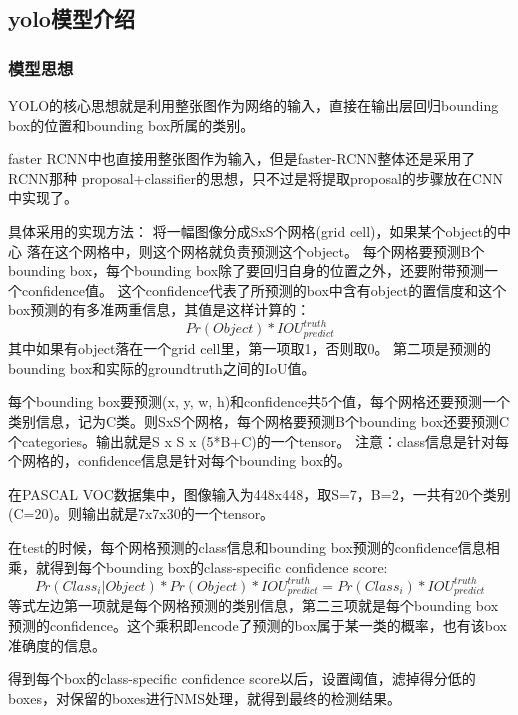 \documentclass[openany]{ctexbook}
\begin{document}
\subsection{yolo模型介绍}
\subsubsection{模型思想}
YOLO的核心思想就是利用整张图作为网络的输入，直接在输出层回归bounding box的位置和bounding box所属的类别。

faster RCNN中也直接用整张图作为输入，但是faster-RCNN整体还是采用了RCNN那种 proposal+classifier的思想，只不过是将提取proposal的步骤放在CNN中实现了。

具体采用的实现方法：
将一幅图像分成SxS个网格(grid cell)，如果某个object的中心 落在这个网格中，则这个网格就负责预测这个object。
每个网格要预测B个bounding box，每个bounding box除了要回归自身的位置之外，还要附带预测一个confidence值。
这个confidence代表了所预测的box中含有object的置信度和这个box预测的有多准两重信息，其值是这样计算的：
$$Pr(Object)*IOU^{truth}_{predict}$$
其中如果有object落在一个grid cell里，第一项取1，否则取0。 第二项是预测的bounding box和实际的groundtruth之间的IoU值。

每个bounding box要预测(x, y, w, h)和confidence共5个值，每个网格还要预测一个类别信息，记为C类。则SxS个网格，每个网格要预测B个bounding box还要预测C个categories。输出就是S x S x (5*B+C)的一个tensor。
注意：class信息是针对每个网格的，confidence信息是针对每个bounding box的。

在PASCAL VOC数据集中，图像输入为448x448，取S=7，B=2，一共有20个类别(C=20)。则输出就是7x7x30的一个tensor。

在test的时候，每个网格预测的class信息和bounding box预测的confidence信息相乘，就得到每个bounding box的class-specific confidence score:
$$Pr(Class_i|Object)*Pr(Object)*IOU^{truth}_{predict}=Pr(Class_i)*IOU^{truth}_{predict}$$
等式左边第一项就是每个网格预测的类别信息，第二三项就是每个bounding box预测的confidence。这个乘积即encode了预测的box属于某一类的概率，也有该box准确度的信息。

得到每个box的class-specific confidence score以后，设置阈值，滤掉得分低的boxes，对保留的boxes进行NMS处理，就得到最终的检测结果。
\end{document}
